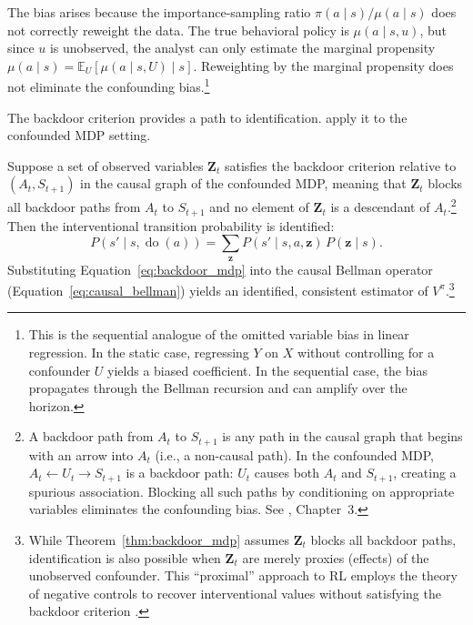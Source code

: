 The bias arises because the importance-sampling ratio $\pi(a \mid s) / \mu(a \mid s)$ does not correctly reweight the data. The true behavioral policy is $\mu(a \mid s, u)$, but since $u$ is unobserved, the analyst can only estimate the marginal propensity $\mu(a \mid s) = \mathbb{E}_{U}[\mu(a \mid s, U) \mid s]$. Reweighting by the marginal propensity does not eliminate the confounding bias.\footnote{This is the sequential analogue of the omitted variable bias in linear regression. In the static case, regressing $Y$ on $X$ without controlling for a confounder $U$ yields a biased coefficient. In the sequential case, the bias propagates through the Bellman recursion and can amplify over the horizon.}

The backdoor criterion \citep{pearl2009causality} provides a path to identification. \citet{zhang2020causal} apply it to the confounded MDP setting.

\begin{theorem}
\label{thm:backdoor_mdp}
Suppose a set of observed variables $\mathbf{Z}_t$ satisfies the backdoor criterion relative to $(A_t, S_{t+1})$ in the causal graph of the confounded MDP, meaning that $\mathbf{Z}_t$ blocks all backdoor paths from $A_t$ to $S_{t+1}$ and no element of $\mathbf{Z}_t$ is a descendant of $A_t$.\footnote{A backdoor path from $A_t$ to $S_{t+1}$ is any path in the causal graph that begins with an arrow into $A_t$ (i.e., a non-causal path). In the confounded MDP, $A_t \leftarrow U_t \rightarrow S_{t+1}$ is a backdoor path: $U_t$ causes both $A_t$ and $S_{t+1}$, creating a spurious association. Blocking all such paths by conditioning on appropriate variables eliminates the confounding bias. See \citet{pearl2009causality}, Chapter~3.} Then the interventional transition probability is identified:
\begin{equation}
P(s' \mid s, \operatorname{do}(a)) = \sum_{\mathbf{z}} P(s' \mid s, a, \mathbf{z}) \, P(\mathbf{z} \mid s).
\label{eq:backdoor_mdp}
\end{equation}
Substituting Equation~\eqref{eq:backdoor_mdp} into the causal Bellman operator (Equation~\ref{eq:causal_bellman}) yields an identified, consistent estimator of $V^\pi$.\footnote{While Theorem~\ref{thm:backdoor_mdp} assumes $\mathbf{Z}_t$ blocks all backdoor paths, identification is also possible when $\mathbf{Z}_t$ are merely proxies (effects) of the unobserved confounder. This ``proximal'' approach to RL employs the theory of negative controls to recover interventional values without satisfying the backdoor criterion \citep{bennett2021proximal}.}
\end{theorem}

